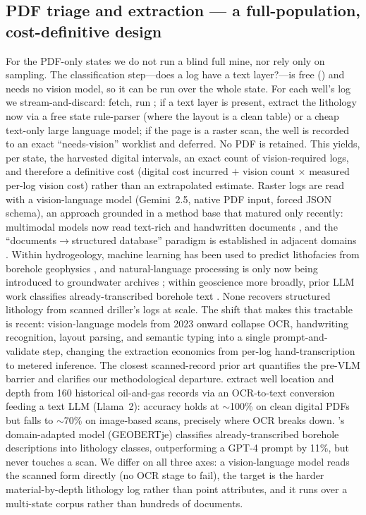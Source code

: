 \documentclass[12pt]{article}
\begin{document}
\subsection{PDF triage and extraction --- a full-population, cost-definitive design}
\label{sec:triage}
For the PDF-only states we do not run a blind full mine, nor rely only on sampling. The
classification step---does a log have a text layer?---is free () and needs no vision model,
so it can be run over the whole state. For each well's log we stream-and-discard: fetch, run
; if a text layer is present, extract the lithology now via a free state rule-parser
(where the layout is a clean table) or a cheap text-only large language model; if the page is a raster
scan, the well is recorded to an exact ``needs-vision'' worklist and deferred. No PDF is retained.
This yields, per state, the harvested digital intervals, an exact count of vision-required logs, and
therefore a definitive cost (digital cost incurred $+$ vision count $\times$ measured per-log vision
cost) rather than an extrapolated estimate. Raster logs are read with a vision-language model (Gemini~2.5,
native PDF input, forced JSON schema), an approach grounded in a method base that matured only recently:
multimodal models now read text-rich and handwritten documents \citep{gemini15,gpt4o,qwen25vl,internvl,
liu2023ocrbench,humphries2024archives,crosilla2025htr}, and the ``documents$\rightarrow$structured
database'' paradigm is established in adjacent domains \citep{dagdelen2024}. Within hydrogeology, machine
learning has been used to predict lithofacies from borehole geophysics \citep{hammond2024lithofacies}, and
natural-language processing is only now being introduced to groundwater archives \citep{christenson2026nlp};
within geoscience more broadly, prior LLM work classifies already-transcribed borehole text
\citep{ghorbanfekr2025geobertje}. None recovers structured lithology from scanned driller's logs at scale. The shift that makes this tractable is recent: vision-language
models from 2023 onward collapse OCR, handwriting recognition, layout parsing, and semantic typing into a
single prompt-and-validate step, changing the extraction economics from per-log hand-transcription to metered
inference. The closest scanned-record prior art quantifies the pre-VLM barrier and clarifies our methodological
departure. \citet{ma2024lanl} extract well location and depth from 160 historical oil-and-gas records via an
OCR-to-text conversion feeding a text LLM (Llama~2): accuracy holds at $\sim$100\% on clean digital PDFs
but falls to $\sim$70\% on image-based scans, precisely where OCR breaks down. \citet{ghorbanfekr2025geobertje}'s
domain-adapted model (GEOBERTje) classifies already-transcribed borehole descriptions into lithology
classes, outperforming a GPT-4 prompt by 11\%, but never touches a scan. We differ on all three axes: a
vision-language model reads the scanned form directly (no OCR stage to fail), the target is the harder
material-by-depth lithology log rather than point attributes, and it runs over a multi-state corpus rather than
hundreds of documents.
\end{document}
